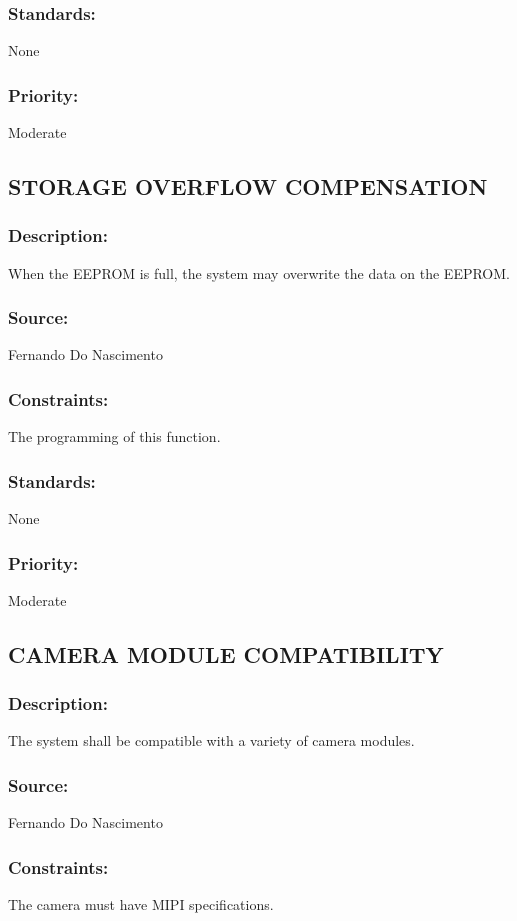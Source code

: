 \subsubsection{Standards:} 
	{None}
\subsubsection{Priority:} 
	{Moderate}
\newline
	
\subsection{\text STORAGE OVERFLOW COMPENSATION}
\subsubsection{Description:} 
	{When the EEPROM is full, the system may overwrite the data on the EEPROM.}
\subsubsection{Source:} 
	{Fernando Do Nascimento}
\subsubsection{Constraints:} 
	{The programming of this function.}
\subsubsection{Standards:} 
	{None}
\subsubsection{Priority:} 
	{Moderate}
\newline
	
\subsection{\text CAMERA MODULE COMPATIBILITY}
\subsubsection{Description:} 
	{The system shall be compatible with a variety of camera modules.}
\subsubsection{Source:} 
	{Fernando Do Nascimento}
\subsubsection{Constraints:} 
	{The camera must have MIPI specifications.}
